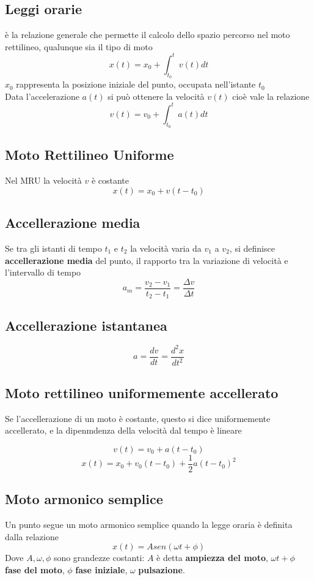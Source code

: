 \documentclass[a4paper]{report}
\begin{document}
  \subsection{Leggi orarie}
  è la relazione generale che permette il calcolo dello spazio percorso nel moto rettilineo, qualunque sia il tipo di moto
  \[ x(t) = x_0 + \int_{t_0}^t v(t) dt \]
  $x_0$ rappresenta la posizione iniziale del punto, occupata nell'istante $t_0$
  \\
    Data l'accelerazione $a(t)$ si può ottenere la velocità $v(t)$ cioè vale la relazione
  \[ v(t) = v_0 + \int_{t_0}^t a(t) dt\]

  \subsection{Moto Rettilineo Uniforme}
  Nel MRU la velocità $v$ è costante
  \[ x(t) = x_0 + v(t-t_0)\]

  \subsection{Accellerazione media}
  Se tra gli istanti di tempo $t_1$ e $t_2$ la velocità varia da $v_1$ a $v_2$, si definisce \textbf{accellerazione media} del punto, il rapporto tra la variazione di velocità e l'intervallo di tempo
  \[ a_m = \frac{v_2-v_1}{t_2-t_1} = \frac{\Delta v}{\Delta t} \]

  \subsection{Accellerazione istantanea}
  \[ a = \frac{dv}{dt} = \frac{d^2x}{dt^2} \]

  \subsection{Moto rettilineo uniformemente accellerato}
  Se l'accellerazione di un moto è costante, questo si dice uniformemente accellerato, e la dipenmdenza della velocità dal tempo è lineare

  \[ v(t) = v_0 + a(t-t_0) \]
  \[ x(t) = x_0 + v_0(t-t_0) + \frac{1}{2} a(t-t_0)^2  \]

  \subsection{Moto armonico semplice}
  Un punto segue un moto armonico semplice quando la legge oraria è definita dalla relazione
  \[ x(t) = A sen(\omega t + \phi) \]
    Dove $A, \omega, \phi$ sono grandezze costanti: $A$ è detta \textbf{ampiezza del moto}, $\omega t + \phi$ \textbf{fase del moto}, $\phi$ \textbf{fase iniziale}, $\omega$ \textbf{pulsazione}.
\end{document}

